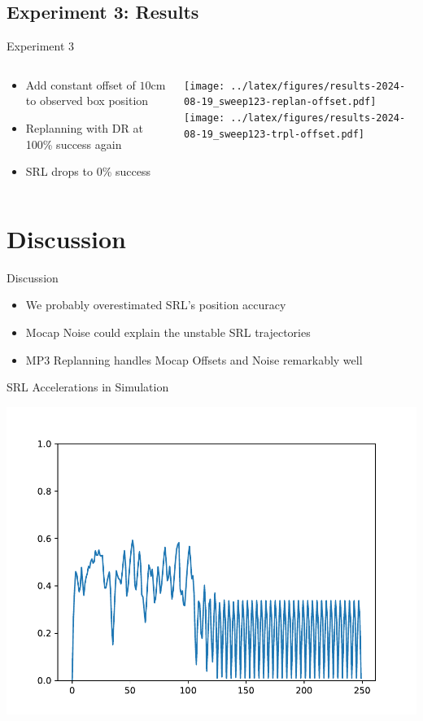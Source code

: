 \documentclass[16:9,en,navbarinfooter]{sdqbeamer}
\begin{document}
\subsection{Experiment 3: Results}
\begin{frame}{Experiment 3}

	\begin{columns}[t]
		\begin{column}{0.3\textwidth}
			\vspace{1cm}
			\begin{itemize}
				\item Add constant offset of $10$cm to observed box position
				\item Replanning with DR at 100\% success again
				\item SRL drops to 0\% success
			\end{itemize}
		\end{column}
		\begin{column}{0.6\textwidth}
			\vspace{1cm}
			\texttt{[image: ../latex/figures/results-2024-08-19\_sweep123-replan-offset.pdf]}\\
			\texttt{[image: ../latex/figures/results-2024-08-19\_sweep123-trpl-offset.pdf]}\\
		\end{column}
	\end{columns}
\end{frame}



\section{Discussion}
\begin{frame}{Discussion}

	\begin{itemize}
		\item We probably overestimated SRL's position accuracy
		\item Mocap Noise could explain the unstable SRL trajectories
		\item MP3 Replanning handles Mocap Offsets and Noise remarkably well
	\end{itemize}
\end{frame}


\appendix
\beginbackup{}
\begin{frame}{SRL Accelerations in Simulation}

	\vspace{1cm}
	\centering
	\includegraphics[width=.6\textwidth]{media/trpl_sim.pdf} \\
\end{frame}
\end{document}
